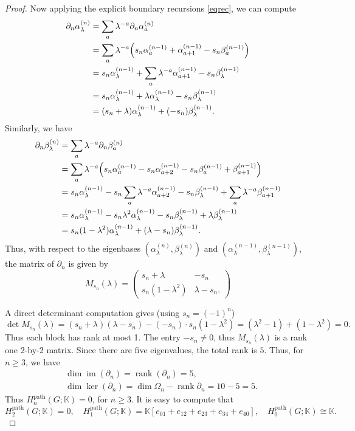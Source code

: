 \documentclass[11pt]{amsart}
\newcommand{\K}{\mathbb K}
\newcommand{\im}{\operatorname{im}}
\newcommand{\rank}{\operatorname{rank}}
\theoremstyle{plain}
\theoremstyle{definition}
\numberwithin{equation}{section}
\begin{document}
\begin{proof}
Now applying the explicit boundary recursions \eqref{eqrec}, we can compute
\begin{align*}
\partial_n \alpha^{(n)}_\lambda
&=\sum_a \lambda^{-a}\partial_n \alpha^{(n)}_a\\
&=\sum_a \lambda^{-a}\Bigl(s_n\alpha^{(n-1)}_a+\alpha^{(n-1)}_{a+1}-s_n\beta^{(n-1)}_a\Bigr)\\
&=s_n\alpha^{(n-1)}_\lambda+\sum_a \lambda^{-a}\alpha^{(n-1)}_{a+1}-s_n\beta^{(n-1)}_\lambda\\
&=s_n\alpha^{(n-1)}_\lambda+\lambda \alpha^{(n-1)}_\lambda-s_n\beta^{(n-1)}_\lambda\\
&=(s_n+\lambda)\alpha^{(n-1)}_\lambda+(-s_n)\beta^{(n-1)}_\lambda.
\end{align*}
Similarly, we have
\begin{align*}
\partial_n \beta^{(n)}_\lambda
&=\sum_a \lambda^{-a}\partial_n \beta^{(n)}_a\\
&=\sum_a \lambda^{-a}\Bigl(s_n\alpha^{(n-1)}_a-s_n\alpha^{(n-1)}_{a+2}-s_n\beta^{(n-1)}_a+\beta^{(n-1)}_{a+1}\Bigr)\\
&=s_n\alpha^{(n-1)}_\lambda-s_n\sum_a \lambda^{-a}\alpha^{(n-1)}_{a+2}-s_n\beta^{(n-1)}_\lambda+\sum_a \lambda^{-a}\beta^{(n-1)}_{a+1}\\
&=s_n\alpha^{(n-1)}_\lambda-s_n\lambda^2\alpha^{(n-1)}_\lambda-s_n\beta^{(n-1)}_\lambda+\lambda\beta^{(n-1)}_\lambda\\
&=s_n(1-\lambda^2)\alpha^{(n-1)}_\lambda+(\lambda-s_n)\beta^{(n-1)}_\lambda.
\end{align*}
Thus, with respect to the eigenbases $(\alpha^{(n)}_\lambda,\beta^{(n)}_\lambda)$ and $(\alpha^{(n-1)}_\lambda,\beta^{(n-1)}_\lambda)$, the matrix of $\partial_n$ is given by
\[M_{s_n}(\lambda)=\begin{pmatrix}
s_n+\lambda & -s_n\\
s_n(1-\lambda^2) & \lambda-s_n.
\end{pmatrix}\]

A direct determinant computation gives (using $s_n=(-1)^n$)
\[\det M_{s_n}(\lambda)=(s_n+\lambda)(\lambda-s_n)-(-s_n)\cdot s_n(1-\lambda^2)=(\lambda^2-1)+(1-\lambda^2)=0.\]
Thus each block has rank at most 1. The entry $-s_n\neq0$, thus $M_{s_n}(\lambda)$ is a rank one 2-by-2 matrix. Since there are five eigenvalues, the total rank is $5$. Thus, for $n\geq3$, we have
\begin{align*}
 &\dim\im(\partial_n)=\rank(\partial_n)=5,\\
 &\dim\ker(\partial_n)=\dim\Omega_n-\rank{\partial_n}=10-5=5.
\end{align*}
Thus $H_n^{\mathrm{path}}(G;\K)=0$, for $n\geq3$. It is easy to compute that 
\[H_2^{\mathrm{path}}(G;\K)=0,\quad H_1^{\mathrm{path}}(G;\K)=\K[e_{01}+e_{12}+e_{23}+e_{34}+e_{40}],\quad H_0^{\mathrm{path}}(G;\K)\cong\K.\]
\end{proof}
\end{document}
